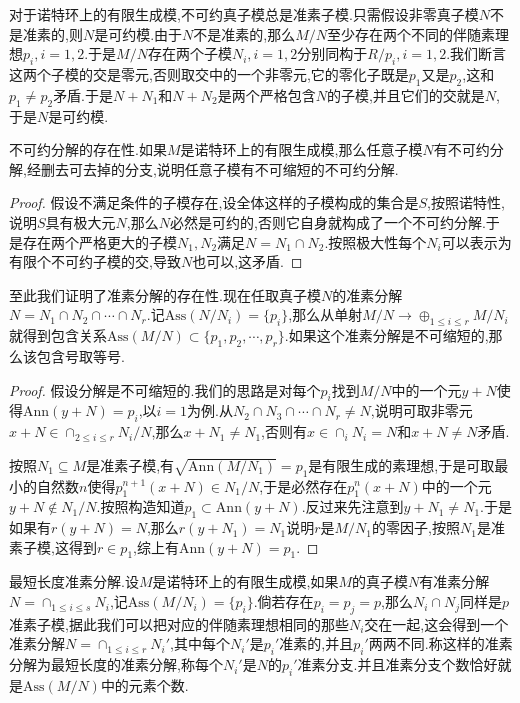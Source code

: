 对于诺特环上的有限生成模,不可约真子模总是准素子模.只需假设非零真子模$N$不是准素的,则$N$是可约模.由于$N$不是准素的,那么$M/N$至少存在两个不同的伴随素理想$p_i,i=1,2$.于是$M/N$存在两个子模$N_i,i=1,2$分别同构于$R/p_i,i=1,2$.我们断言这两个子模的交是零元,否则取交中的一个非零元,它的零化子既是$p_1$又是$p_2$,这和$p_1\not=p_2$矛盾.于是$N+N_1$和$N+N_2$是两个严格包含$N$的子模,并且它们的交就是$N$,于是$N$是可约模.

不可约分解的存在性.如果$M$是诺特环上的有限生成模,那么任意子模$N$有不可约分解,经删去可去掉的分支,说明任意子模有不可缩短的不可约分解.
\begin{proof}
	
	假设不满足条件的子模存在,设全体这样的子模构成的集合是$S$,按照诺特性,说明$S$具有极大元$N$,那么$N$必然是可约的,否则它自身就构成了一个不可约分解.于是存在两个严格更大的子模$N_1,N_2$满足$N=N_1\cap N_2$.按照极大性每个$N_i$可以表示为有限个不可约子模的交,导致$N$也可以,这矛盾.
\end{proof}

至此我们证明了准素分解的存在性.现在任取真子模$N$的准素分解$N=N_1\cap N_2\cap\cdots\cap N_r$.记$\mathrm{Ass}(N/N_i)=\{p_i\}$,那么从单射$M/N\to\oplus_{1\le i\le r}M/N_i$就得到包含关系$\mathrm{Ass}(M/N)\subset\{p_1,p_2,\cdots,p_r\}$.如果这个准素分解是不可缩短的,那么该包含号取等号.
\begin{proof}
	
	假设分解是不可缩短的.我们的思路是对每个$p_i$找到$M/N$中的一个元$y+N$使得$\mathrm{Ann}(y+N)=p_i$,以$i=1$为例.从$N_2\cap N_3\cap\cdots\cap N_r\not=N$,说明可取非零元$x+N\in\cap_{2\le i\le r}N_i/N$,那么$x+N_1\not=N_1$,否则有$x\in \cap_iN_i=N$和$x+N\not=N$矛盾.
	
	按照$N_1\subseteq M$是准素子模,有$\sqrt{\mathrm{Ann}(M/N_1)}=p_1$是有限生成的素理想,于是可取最小的自然数$n$使得$p_1^{n+1}(x+N)\in N_1/N$,于是必然存在$p_1^n(x+N)$中的一个元$y+N\not\in N_1/N$.按照构造知道$p_1\subset\mathrm{Ann}(y+N)$.反过来先注意到$y+N_1\not=N_1$.于是如果有$r(y+N)=N$,那么$r(y+N_1)=N_1$说明$r$是$M/N_1$的零因子,按照$N_1$是准素子模,这得到$r\in p_1$,综上有$\mathrm{Ann}(y+N)=p_1$.
\end{proof}

最短长度准素分解.设$M$是诺特环上的有限生成模,如果$M$的真子模$N$有准素分解$N=\cap_{1\le i\le s}N_i$,记$\mathrm{Ass}(M/N_i)=\{p_i\}$.倘若存在$p_i=p_j=p$,那么$N_i\cap N_j$同样是$p$准素子模,据此我们可以把对应的伴随素理想相同的那些$N_i$交在一起,这会得到一个准素分解$N=\cap_{1\le i\le r}N_i'$,其中每个$N_i'$是$p_i'$准素的,并且$p_i'$两两不同.称这样的准素分解为最短长度的准素分解,称每个$N_i'$是$N$的$p_i'$准素分支.并且准素分支个数恰好就是$\mathrm{Ass}(M/N)$中的元素个数.

